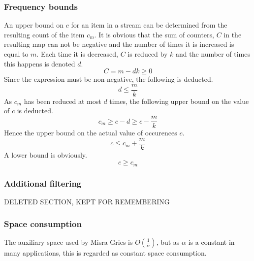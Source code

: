 \subsubsection{Frequency bounds}
An upper bound on \(c\) for an item in a stream can be determined from the resulting count of the item \(c_m\). It is obvious that the sum of counters, \(C\) in the resulting map can not be negative and the number of times it is increased is equal to \(m\). Each time it is decreased, \(C\) is reduced by \(k\) and the number of times this happens is denoted \(d\). 
\[C=m-dk\geq 0\]
Since the expression must be non-negative, the following is deducted.
\[d\leq \frac{m}{k}\]
As \(c_m\) has been reduced at most \(d\) times, the following upper bound on the value of \(c\) is deducted.
\[c_m \geq c-d \geq c-\frac{m}{k}\]
Hence the upper bound on the actual value of occurences \(c\).
\[c \leq c_m+\frac{m}{k}\]
A lower bound is obviously.
\[c \geq c_m\]

\subsubsection{Additional filtering}
DELETED SECTION, KEPT FOR REMEMBERING

\subsubsection{Space consumption}
The auxiliary space used by Misra Gries is \(O\left(\frac{1}{\alpha}\right)\), but as \(\alpha\) is a constant in many applications, this is regarded as constant space consumption.
